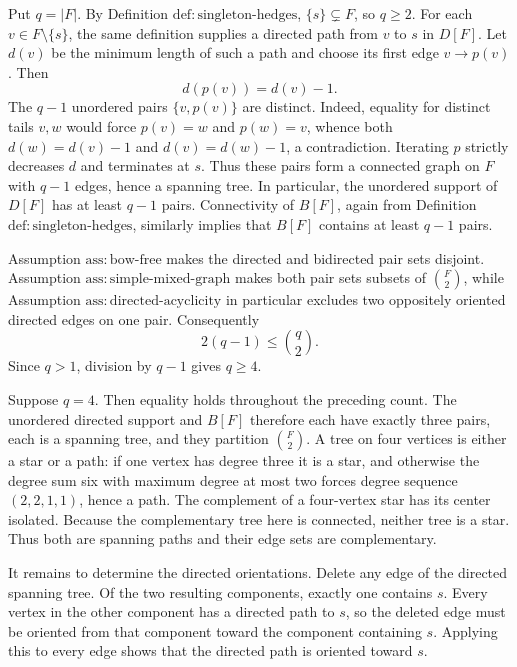 Put \(q=|F|\).  By Definition \(\mathrm{def{:}singleton\mbox{-}hedges}\),
\(\{s\}\subsetneq F\), so \(q\geq 2\).  For each
\(v\in F\setminus\{s\}\), the same definition supplies a directed path from
\(v\) to \(s\) in \(D[F]\).  Let \(d(v)\) be the minimum length of such a
path and choose its first edge \(v\to p(v)\).  Then
\[
 d(p(v))=d(v)-1.
\]
The \(q-1\) unordered pairs \(\{v,p(v)\}\) are distinct.  Indeed, equality
for distinct tails \(v,w\) would force \(p(v)=w\) and \(p(w)=v\), whence
both \(d(w)=d(v)-1\) and \(d(v)=d(w)-1\), a contradiction.  Iterating
\(p\) strictly decreases \(d\) and terminates at \(s\).  Thus these pairs
form a connected graph on \(F\) with \(q-1\) edges, hence a spanning tree.
In particular, the unordered support of \(D[F]\) has at least \(q-1\)
pairs.  Connectivity of \(B[F]\), again from Definition
\(\mathrm{def{:}singleton\mbox{-}hedges}\), similarly implies that
\(B[F]\) contains at least \(q-1\) pairs.

Assumption \(\mathrm{ass{:}bow\mbox{-}free}\) makes the directed and
bidirected pair sets disjoint.  Assumption
\(\mathrm{ass{:}simple\mbox{-}mixed\mbox{-}graph}\) makes both pair sets
subsets of \(\binom F2\), while Assumption
\(\mathrm{ass{:}directed\mbox{-}acyclicity}\) in particular excludes two
oppositely oriented directed edges on one pair.  Consequently
\[
 2(q-1)\leq \binom q2.
\]
Since \(q>1\), division by \(q-1\) gives \(q\geq4\).

Suppose \(q=4\).  Then equality holds throughout the preceding count.
The unordered directed support and \(B[F]\) therefore each have exactly
three pairs, each is a spanning tree, and they partition \(\binom F2\).
A tree on four vertices is either a star or a path: if one vertex has degree
three it is a star, and otherwise the degree sum six with maximum degree at
most two forces degree sequence \((2,2,1,1)\), hence a path.  The complement
of a four-vertex star has its center isolated.  Because the complementary
tree here is connected, neither tree is a star.  Thus both are spanning
paths and their edge sets are complementary.

It remains to determine the directed orientations.  Delete any edge of the
directed spanning tree.  Of the two resulting components, exactly one
contains \(s\).  Every vertex in the other component has a directed path to
\(s\), so the deleted edge must be oriented from that component toward the
component containing \(s\).  Applying this to every edge shows that the
directed path is oriented toward \(s\).

